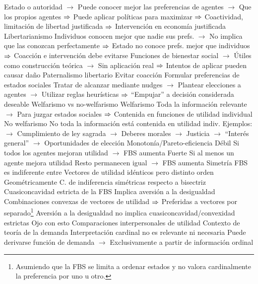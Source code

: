 \documentclass{nuevotema}
\begin{document}
\begin{esquemal}
				\4[] Estado o autoridad
				\4[] $\to$ Puede conocer mejor las preferencias de agentes
				\4[] $\to$ Que los propios agentes
				\4[] $\Rightarrow$ Puede aplicar políticas para maximizar
				\4[] $\Rightarrow$ Coactividad, limitación de libertad justificada
				\4[] $\Rightarrow$ Intervención en economía justificada
				\4 Libertarianismo
				\4[] Individuos conocen mejor que nadie sus prefs.
				\4[] $\to$ No implica que las conozcan perfectamente
				\4[] $\Rightarrow$ Estado no conoce prefs. mejor que individuos
				\4[] $\Rightarrow$ Coacción e intervención debe evitarse
				\4[] Funciones de bienestar social
				\4[] $\to$ Útiles como construcción teórica
				\4[] $\to$ Sin aplicación real
				\4[] $\Rightarrow$ Intentos de aplicar pueden causar daño
				\4 Paternalismo libertario
				\4[] Evitar coacción
				\4[] Formular preferencias de estados sociales
				\4[] Tratar de alcanzar mediante nudges
				\4[] $\to$ Plantear elecciones a agentes
				\4[] $\to$ Utilizar reglas heurísticas
				\4[] $\Rightarrow$ ``Empujar'' a decisión considerada deseable
			\3 Welfarismo vs no-welfarismo
				\4 Welfarismo
				\4[] Toda la información relevante
				\4[] $\to$ Para juzgar estados sociales
				\4[] $\Rightarrow$ Contenida en funciones de utilidad individual
				\4 No welfarismo
				\4[] No toda la información está contenida en utilidad indiv.
				\4[] Ejemplos:
				\4[] $\to$ Cumplimiento de ley sagrada
				\4[] $\to$ Deberes morales
				\4[] $\to$ Justicia
				\4[] $\to$ ``Interés general''
				\4[] $\to$ Oportunidades de elección
			\3 Monotonía/Pareto-eficiencia
				\4 Débil
				\4[] Si todos los agentes mejoran utilidad
				\4[] $\to$ FBS aumenta
				\4 Fuerte
				\4[] Si al menos un agente mejora utilidad
				\4[] Resto permanecen igual
				\4[] $\to$ FBS aumenta
			\3 Simetría
				\4 FBS es indiferente entre
				\4[] Vectores de utilidad idénticos pero distinto orden
				\4 Geométricamente
				\4[] C. de indiferencia simétricas respecto a bisectriz
			\3 Cuasiconcavidad estricta de la FBS
				\4 Implica aversión a la desigualdad
				\4 Combinaciones convexas de vectores de utilidad
				\4[] $\Rightarrow$ Preferidas a vectores por separado\footnote{Asumiendo que la FBS se limita a ordenar estados y no valora cardinalmente la preferencia por uno u otro.}
				\4 Aversión a la desigualdad no implica cuasiconcavidad/convexidad estrictas
				\4[] Ojo con esto
				\4[] 
			\3 Comparaciones interpersonales de utilidad
				\4 Contexto de teoría de la demanda
				\4[] Interpretación cardinal no es relevante ni necesaria
				\4[] Puede derivarse función de demanda
				\4[] $\to$ Exclusivamente a partir de información ordinal

\end{esquemal}
\end{document}
